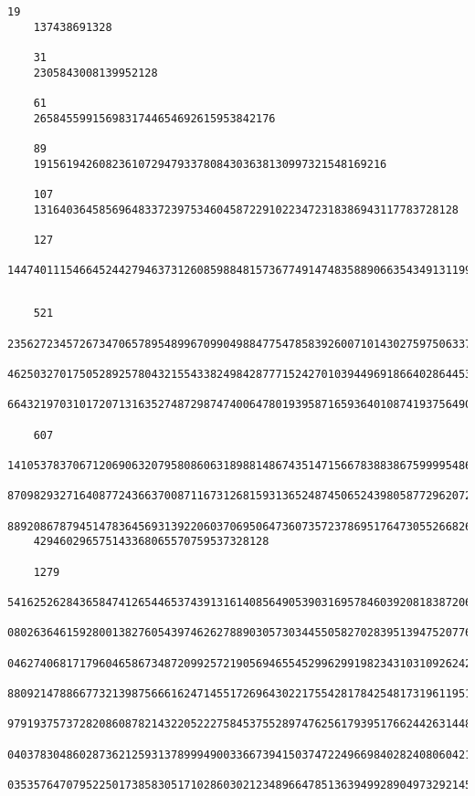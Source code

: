 \documentclass[11pt,twoside,openany]{memoir}
\begin{document}
\begin{tcolorbox}
\begin{Verbatim}[fontsize=\tiny]
    19
    137438691328
    
    31
    2305843008139952128
    
    61
    2658455991569831744654692615953842176
    
    89
    191561942608236107294793378084303638130997321548169216
    
    107
    13164036458569648337239753460458722910223472318386943117783728128
    
    127
    14474011154664524427946373126085988481573677491474835889066354349131199152128

\end{Verbatim}
\end{tcolorbox}

\begin{tcolorbox}
\begin{Verbatim}[fontsize=\tiny]
    
    521
    23562723457267347065789548996709904988477547858392600710143027597506337283178622239730365539602600561360255566
    46250327017505289257804321554338249842877715242701039449691866402864453412803383143979023683862403317143592235
    6643219703101720713163527487298747400647801939587165936401087419375649057918549492160555646976
    
    607
    14105378370671206906320795808606318988148674351471566783883867599995486774265238011410419332903769025156195056
    87098293271640877243663700871167312681593136524874506524398058772962072974467232951666582288469268077866528701
    88920867879451478364569313922060370695064736073572378695176473055266826253284886383715072974324463835300053138
    429460296575143368065570759537328128
    
    1279
    54162526284365847412654465374391316140856490539031695784603920818387206994158534859198999921056719921919057390
    08026364615928001382760543974626278890305730344550582702839513947520776904492443149486172943511312628083790493
    04627406817179604658673487209925721905694655452996299198234310310926242444635477896354414813917198164416055867
    88092147886677321398756661624714551726964302217554281784254817319611951659855553573937788923405146222324506715
    97919375737282086087821432205222758453755289747625617939517662442631448031344693508520365758479824753602117288
    04037830486028736212593137899949003366739415037472249669840282408060421086900776703952592318946662736152127756
    03535764707952250173858305171028603021234896647851363949928904973292145107505979911456221519899345764984291328



\end{Verbatim}
\end{tcolorbox}
\end{document}
